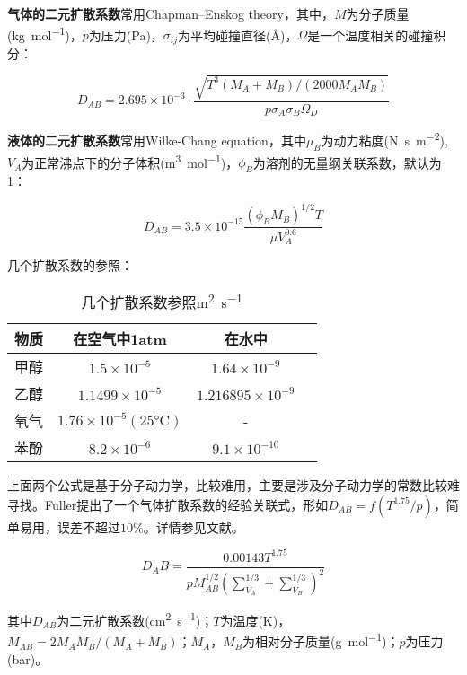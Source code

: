 \textbf{气体的二元扩散系数}常用Chapman–Enskog theory，其中，$ M $为分子质量(\si{\kilogram\per\mol})，$ p $为压力(\si{\pascal})，$ \sigma_{ij} $为平均碰撞直径(\si{\angstrom})，$ \Omega $是一个温度相关的碰撞积分：

\begin{equation}
D_{AB} = 2.695\times 10^{-3}\cdot \frac{\sqrt{T^3 (M_A+M_B)/(2000M_AM_B)}}{p\sigma_A\sigma_B\Omega_D}
\end{equation}

\textbf{液体的二元扩散系数}常用Wilke-Chang equation，其中$ \mu_B $为动力粘度(\si{\newton\second\per\square\meter}),$ V_A $为正常沸点下的分子体积(\si{\cubic\meter\per\mole})，$ \phi_B $为溶剂的无量纲关联系数，默认为1：

\begin{equation}
D_{AB} = 3.5\times 10^{-15} \frac{(\phi_B M_B)^{1/2} T}{\mu V_A^{0.6}}
\end{equation}

几个扩散系数的参照：

\begin{table}[!htb]
    \centering
    \caption{几个扩散系数参照\si{\square\meter\per\second}}
    \begin{tabular}{cccc}
        \toprule
        物质 & 在空气中1atm & 在水中 \\
        \midrule
        甲醇 & $ 1.5\times10^{-5} $ & $ 1.64\times10^{-9} $ \\
        乙醇 & $ 1.1499\times10^{-5} $ & $ 1.216895\times10^{-9} $ \\
        氧气 & $ 1.76\times10^{-5}(25\si{\degreeCelsius}) $ & - \\
        苯酚 & $ 8.2\times10^{-6} $ & $ 9.1\times10^{-10} $ \\
        \bottomrule
    \end{tabular}
\end{table}

上面两个公式是基于分子动力学，比较难用，主要是涉及分子动力学的常数比较难寻找。Fuller提出了一个气体扩散系数的经验关联式，形如$ D_{AB}=f(T^{1.75}/p) $，简单易用，误差不超过$ 10\% $。详情参见文献\cite{poling2001properties}。

\begin{equation}
D_AB=\frac{0.00143T^{1.75}}{pM_{AB}^{1/2}\left( \sum_{V_A}^{1/3} + \sum_{V_B}^{1/3} \right)^2 }
\end{equation}

其中$ D_{AB} $为二元扩散系数(\si{cm\squared\per\second})；$ T $为温度(\si{\kelvin})，$ M_{AB}=2M_A M_B/(M_A + M_B) $；$ M_A $，$ M_B $为相对分子质量(\si{\g\per\mole})；$ p $为压力(\si{bar})。

